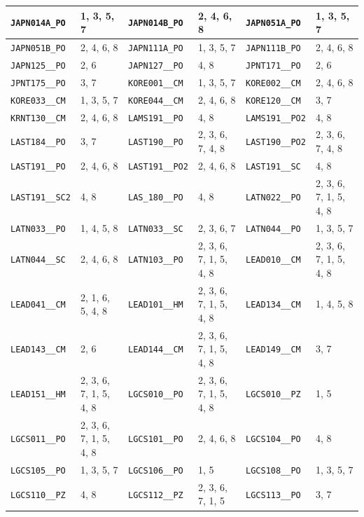 \begin{longtable}{|l|l||l|l||l|l|}
    \verb|JAPN014A_PO| & 1, 3, 5, 7 & \verb|JAPN014B_PO| & 2, 4, 6, 8 & \verb|JAPN051A_PO| & 1, 3, 5, 7\\\hline
    \verb|JAPN051B_PO| & 2, 4, 6, 8 & \verb|JAPN111A_PO| & 1, 3, 5, 7 & \verb|JAPN111B_PO| & 2, 4, 6, 8\\\hline
    \verb|JAPN125__PO| & 2, 6 & \verb|JAPN127__PO| & 4, 8 & \verb|JPNT171__PO| & 2, 6\\\hline
    \verb|JPNT175__PO| & 3, 7 & \verb|KORE001__CM| & 1, 3, 5, 7 & \verb|KORE002__CM| & 2, 4, 6, 8\\\hline
    \verb|KORE033__CM| & 1, 3, 5, 7 & \verb|KORE044__CM| & 2, 4, 6, 8 & \verb|KORE120__CM| & 3, 7\\\hline
    \verb|KRNT130__CM| & 2, 4, 6, 8 & \verb|LAMS191__PO| & 4, 8 & \verb|LAMS191__PO2| & 4, 8\\\hline
    \verb|LAST184__PO| & 3, 7 & \verb|LAST190__PO| & 2, 3, 6, 7, 4, 8 & \verb|LAST190__PO2| & 2, 3, 6, 7, 4, 8\\\hline
    \verb|LAST191__PO| & 2, 4, 6, 8 & \verb|LAST191__PO2| & 2, 4, 6, 8 & \verb|LAST191__SC| & 4, 8\\\hline
    \verb|LAST191__SC2| & 4, 8 & \verb|LAS_180__PO| & 4, 8 & \verb|LATN022__PO| & 2, 3, 6, 7, 1, 5, 4, 8\\\hline
    \verb|LATN033__PO| & 1, 4, 5, 8 & \verb|LATN033__SC| & 2, 3, 6, 7 & \verb|LATN044__PO| & 1, 3, 5, 7\\\hline
    \verb|LATN044__SC| & 2, 4, 6, 8 & \verb|LATN103__PO| & 2, 3, 6, 7, 1, 5, 4, 8 & \verb|LEAD010__CM| & 2, 3, 6, 7, 1, 5, 4, 8\\\hline
    \verb|LEAD041__CM| & 2, 1, 6, 5, 4, 8 & \verb|LEAD101__HM| & 2, 3, 6, 7, 1, 5, 4, 8 & \verb|LEAD134__CM| & 1, 4, 5, 8\\\hline
    \verb|LEAD143__CM| & 2, 6 & \verb|LEAD144__CM| & 2, 3, 6, 7, 1, 5, 4, 8 & \verb|LEAD149__CM| & 3, 7\\\hline
    \verb|LEAD151__HM| & 2, 3, 6, 7, 1, 5, 4, 8 & \verb|LGCS010__PO| & 2, 3, 6, 7, 1, 5, 4, 8 & \verb|LGCS010__PZ| & 1, 5\\\hline
    \verb|LGCS011__PO| & 2, 3, 6, 7, 1, 5, 4, 8 & \verb|LGCS101__PO| & 2, 4, 6, 8 & \verb|LGCS104__PO| & 4, 8\\\hline
    \verb|LGCS105__PO| & 1, 3, 5, 7 & \verb|LGCS106__PO| & 1, 5 & \verb|LGCS108__PO| & 1, 3, 5, 7\\\hline
    \verb|LGCS110__PZ| & 4, 8 & \verb|LGCS112__PZ| & 2, 3, 6, 7, 1, 5 & \verb|LGCS113__PO| & 3, 7\\\hline

\end{longtable}
